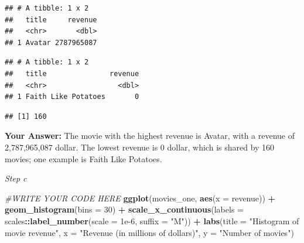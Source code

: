\documentclass[
]{article}
\newenvironment{Shaded}{\begin{snugshade}}{\end{snugshade}}
\newcommand{\AttributeTok}[1]{\textcolor[rgb]{0.13,0.29,0.53}{#1}}
\newcommand{\CommentTok}[1]{\textcolor[rgb]{0.56,0.35,0.01}{\textit{#1}}}
\newcommand{\DecValTok}[1]{\textcolor[rgb]{0.00,0.00,0.81}{#1}}
\newcommand{\FloatTok}[1]{\textcolor[rgb]{0.00,0.00,0.81}{#1}}
\newcommand{\FunctionTok}[1]{\textcolor[rgb]{0.13,0.29,0.53}{\textbf{#1}}}
\newcommand{\NormalTok}[1]{#1}
\newcommand{\SpecialCharTok}[1]{\textcolor[rgb]{0.81,0.36,0.00}{\textbf{#1}}}
\newcommand{\StringTok}[1]{\textcolor[rgb]{0.31,0.60,0.02}{#1}}
\begin{document}
\begin{verbatim}
## # A tibble: 1 x 2
##   title     revenue
##   <chr>       <dbl>
## 1 Avatar 2787965087
\end{verbatim}

\begin{Shaded}
\end{Shaded}

\begin{verbatim}
## # A tibble: 1 x 2
##   title               revenue
##   <chr>                 <dbl>
## 1 Faith Like Potatoes       0
\end{verbatim}

\begin{Shaded}
\end{Shaded}

\begin{verbatim}
## [1] 160
\end{verbatim}

\textbf{Your Answer:} The movie with the highest revenue is Avatar, with
a revenue of 2,787,965,087 dollar. The lowest revenue is 0 dollar, which
is shared by 160 movies; one example is Faith Like Potatoes.

\emph{Step c}

\begin{Shaded}
\begin{Highlighting}[]
\CommentTok{\#WRITE YOUR CODE HERE}
\FunctionTok{ggplot}\NormalTok{(movies\_one, }\FunctionTok{aes}\NormalTok{(}\AttributeTok{x =}\NormalTok{ revenue)) }\SpecialCharTok{+}
  \FunctionTok{geom\_histogram}\NormalTok{(}\AttributeTok{bins =} \DecValTok{30}\NormalTok{) }\SpecialCharTok{+}
  \FunctionTok{scale\_x\_continuous}\NormalTok{(}\AttributeTok{labels =}\NormalTok{ scales}\SpecialCharTok{::}\FunctionTok{label\_number}\NormalTok{(}\AttributeTok{scale =} \FloatTok{1e{-}6}\NormalTok{, }\AttributeTok{suffix =} \StringTok{"M"}\NormalTok{)) }\SpecialCharTok{+}
  \FunctionTok{labs}\NormalTok{(}\AttributeTok{title =} \StringTok{"Histogram of movie revenue"}\NormalTok{,}
       \AttributeTok{x =} \StringTok{"Revenue (in millions of dollars)"}\NormalTok{,}
       \AttributeTok{y =} \StringTok{"Number of movies"}\NormalTok{)}
\end{Highlighting}
\end{Shaded}
\end{document}
